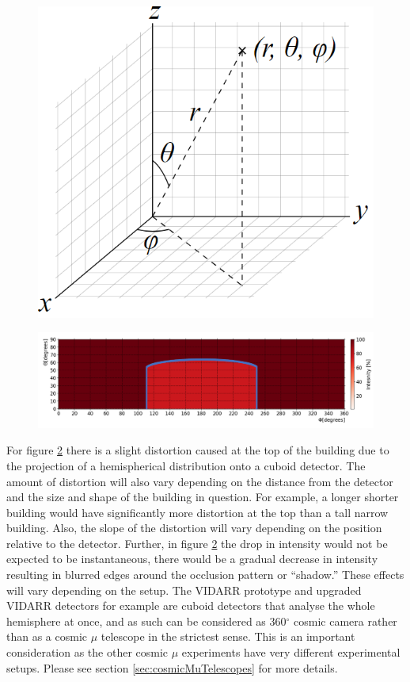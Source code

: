  \begin{figure}[htbp]
 \centering
 \includegraphics[width=0.5\linewidth]{Chapter5/Figs/wylfaRasterNew/sphericalPolarCoordinatesystem.png}
 \label{fig:sphericalPolarCoordinateSystem}
\end{figure}

 \begin{figure}[htbp]
 \centering
 \includegraphics[width=\linewidth]{Chapter5/Figs/wylfaRasterNew/thetaVsPhiExpectedCube.png}
 \label{fig:thetaVsPhiExpectedCube}
\end{figure}

For figure \ref{fig:thetaVsPhiExpectedCube} there is a slight distortion caused at the top of the building due to the projection of a hemispherical distribution onto a cuboid detector. The amount of distortion will also vary depending on the distance from the detector and the size and shape of the building in question. For example, a longer shorter building would have significantly more distortion at the top than a tall narrow building. Also, the slope of the distortion will vary depending on the position relative to the detector. Further, in figure \ref{fig:thetaVsPhiExpectedCube} the drop in intensity would not be expected to be instantaneous, there would be a gradual decrease in intensity resulting in blurred edges around the occlusion pattern or ``shadow.'' These effects will vary depending on the setup. The VIDARR prototype and upgraded VIDARR detectors for example are cuboid detectors that analyse the whole hemisphere at once, and as such can be considered as 360$^\circ$ cosmic camera rather than as a cosmic $\mu$ telescope in the strictest sense. This is an important consideration as the other cosmic $\mu$ experiments have very different experimental setups. Please see section \ref{sec:cosmicMuTelescopes} for more details.

